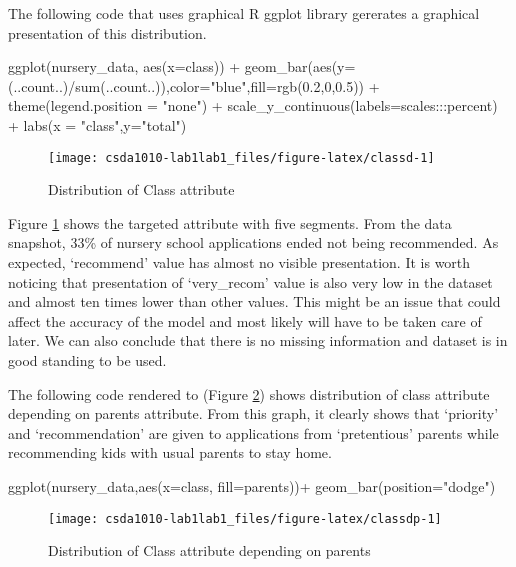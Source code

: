 The following code that uses graphical R ggplot library
\citep{R-ggplot2} gererates a graphical presentation of this
distribution.

\begin{Schunk}
\begin{Sinput}
ggplot(nursery_data, aes(x=class)) + 
  geom_bar(aes(y= (..count..)/sum(..count..)),color="blue",fill=rgb(0.2,0,0.5)) +
  theme(legend.position = "none") +
  scale_y_continuous(labels=scales:::percent) +
  labs(x = "class",y="total")
\end{Sinput}
\begin{figure}[h]

{\centering \texttt{[image: csda1010-lab1lab1\_files/figure-latex/classd-1]} 

}

\caption[Distribution of Class attribute]{Distribution of Class attribute}\label{fig:classd}
\end{figure}
\end{Schunk}

Figure \ref{fig:classd} shows the targeted attribute with five segments.
From the data snapshot, 33\% of nursery school applications ended not
being recommended. As expected, `recommend' value has almost no visible
presentation. It is worth noticing that presentation of `very\_recom'
value is also very low in the dataset and almost ten times lower than
other values. This might be an issue that could affect the accuracy of
the model and most likely will have to be taken care of later. We can
also conclude that there is no missing information and dataset is in
good standing to be used.

The following code rendered to (Figure \ref{fig:classdp}) shows
distribution of class attribute depending on parents attribute. From
this graph, it clearly shows that `priority' and `recommendation' are
given to applications from `pretentious' parents while recommending kids
with usual parents to stay home.

\begin{Schunk}
\begin{Sinput}
ggplot(nursery_data,aes(x=class, fill=parents))+
  geom_bar(position="dodge")
\end{Sinput}
\begin{figure}[h]

{\centering \texttt{[image: csda1010-lab1lab1\_files/figure-latex/classdp-1]} 

}

\caption[Distribution of Class attribute depending on parents]{Distribution of Class attribute depending on parents}\label{fig:classdp}
\end{figure}
\end{Schunk}

